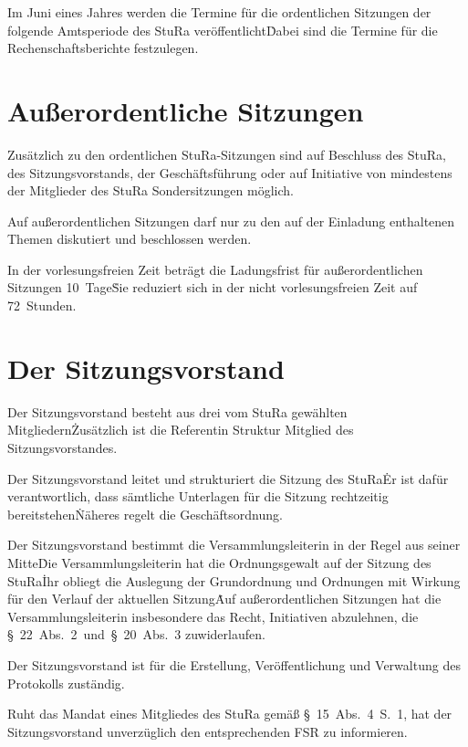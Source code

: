 \begin{multicols}{2}
\Abs \Satz Im Juni eines Jahres werden die Termine für die ordentlichen Sitzungen der folgende Amtsperiode des StuRa veröffentlicht\. Dabei sind die Termine für die Rechenschaftsberichte festzulegen.



\section{Außerordentliche Sitzungen}

\Abs \Satz Zusätzlich zu den ordentlichen StuRa-Sitzungen sind auf Beschluss des StuRa, des Sitzungsvorstands, der Geschäftsführung oder auf Initiative von mindestens  der Mitglieder des StuRa Sondersitzungen möglich.

\Abs \Satz Auf außerordentlichen Sitzungen darf nur zu den auf der Einladung enthaltenen Themen diskutiert und beschlossen werden.

\Abs \Satz In der vorlesungsfreien Zeit beträgt die Ladungsfrist für außerordentlichen Sitzungen 10~Tage\. Sie reduziert sich in der nicht vorlesungsfreien Zeit auf 72~Stunden.



\section{Der Sitzungsvorstand}

\Abs \Satz Der Sitzungsvorstand besteht aus drei vom StuRa gewählten Mitgliedern\. Zusätzlich ist die Referentin Struktur Mitglied des Sitzungsvorstandes.

\Abs \Satz Der Sitzungsvorstand leitet und strukturiert die Sitzung des StuRa\. Er ist dafür verantwortlich, dass sämtliche Unterlagen für die Sitzung rechtzeitig bereitstehen\. Näheres regelt die Geschäftsordnung.

\Abs \Satz Der Sitzungsvorstand bestimmt die Versammlungsleiterin in der Regel aus seiner Mitte\. Die Versammlungsleiterin hat die Ordnungsgewalt auf der Sitzung des StuRa\. Ihr obliegt die Auslegung der Grundordnung und Ordnungen mit Wirkung für den Verlauf der aktuellen Sitzung\. Auf außerordentlichen Sitzungen hat die Versammlungsleiterin insbesondere das Recht, Initiativen abzulehnen, die §~22~Abs.~2~und~§~20~Abs.~3 zuwiderlaufen.

\Abs \Satz Der Sitzungsvorstand ist für die Erstellung, Veröffentlichung und Verwaltung des Protokolls zuständig.

\Abs \Satz Ruht das Mandat eines Mitgliedes des StuRa gemäß §~15~Abs.~4~S.~1, hat der Sitzungsvorstand unverzüglich den entsprechenden FSR zu informieren.



\end{multicols}
